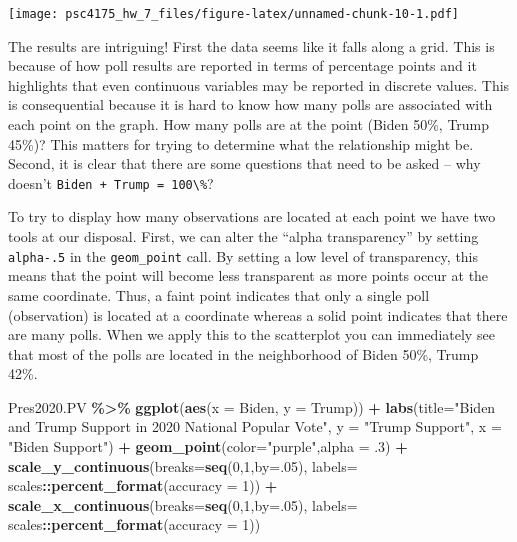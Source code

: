\documentclass[
]{article}
\newenvironment{Shaded}{\begin{snugshade}}{\end{snugshade}}
\newcommand{\AttributeTok}[1]{\textcolor[rgb]{0.13,0.29,0.53}{#1}}
\newcommand{\DecValTok}[1]{\textcolor[rgb]{0.00,0.00,0.81}{#1}}
\newcommand{\FunctionTok}[1]{\textcolor[rgb]{0.13,0.29,0.53}{\textbf{#1}}}
\newcommand{\NormalTok}[1]{#1}
\newcommand{\SpecialCharTok}[1]{\textcolor[rgb]{0.81,0.36,0.00}{\textbf{#1}}}
\newcommand{\StringTok}[1]{\textcolor[rgb]{0.31,0.60,0.02}{#1}}
\begin{document}
\texttt{[image: psc4175\_hw\_7\_files/figure-latex/unnamed-chunk-10-1.pdf]}

The results are intriguing! First the data seems like it falls along a
grid. This is because of how poll results are reported in terms of
percentage points and it highlights that even continuous variables may
be reported in discrete values. This is consequential because it is hard
to know how many polls are associated with each point on the graph. How
many polls are at the point (Biden 50\%, Trump 45\%)? This matters for
trying to determine what the relationship might be. Second, it is clear
that there are some questions that need to be asked -- why doesn't
\texttt{Biden\ +\ Trump\ =\ 100\textbackslash{}\%}?

To try to display how many observations are located at each point we
have two tools at our disposal. First, we can alter the ``alpha
transparency'' by setting \texttt{alpha-.5} in the \texttt{geom\_point}
call. By setting a low level of transparency, this means that the point
will become less transparent as more points occur at the same
coordinate. Thus, a faint point indicates that only a single poll
(observation) is located at a coordinate whereas a solid point indicates
that there are many polls. When we apply this to the scatterplot you can
immediately see that most of the polls are located in the neighborhood
of Biden 50\%, Trump 42\%.

\begin{Shaded}
\begin{Highlighting}[]
\NormalTok{Pres2020.PV }\SpecialCharTok{\%\textgreater{}\%}
  \FunctionTok{ggplot}\NormalTok{(}\FunctionTok{aes}\NormalTok{(}\AttributeTok{x =}\NormalTok{ Biden, }\AttributeTok{y =}\NormalTok{ Trump)) }\SpecialCharTok{+} 
  \FunctionTok{labs}\NormalTok{(}\AttributeTok{title=}\StringTok{"Biden and Trump Support in 2020 National Popular Vote"}\NormalTok{,}
       \AttributeTok{y =} \StringTok{"Trump Support"}\NormalTok{,}
       \AttributeTok{x =} \StringTok{"Biden Support"}\NormalTok{) }\SpecialCharTok{+} 
  \FunctionTok{geom\_point}\NormalTok{(}\AttributeTok{color=}\StringTok{"purple"}\NormalTok{,}\AttributeTok{alpha =}\NormalTok{ .}\DecValTok{3}\NormalTok{) }\SpecialCharTok{+} 
    \FunctionTok{scale\_y\_continuous}\NormalTok{(}\AttributeTok{breaks=}\FunctionTok{seq}\NormalTok{(}\DecValTok{0}\NormalTok{,}\DecValTok{1}\NormalTok{,}\AttributeTok{by=}\NormalTok{.}\DecValTok{05}\NormalTok{),}
                     \AttributeTok{labels=}\NormalTok{ scales}\SpecialCharTok{::}\FunctionTok{percent\_format}\NormalTok{(}\AttributeTok{accuracy =} \DecValTok{1}\NormalTok{)) }\SpecialCharTok{+}
  \FunctionTok{scale\_x\_continuous}\NormalTok{(}\AttributeTok{breaks=}\FunctionTok{seq}\NormalTok{(}\DecValTok{0}\NormalTok{,}\DecValTok{1}\NormalTok{,}\AttributeTok{by=}\NormalTok{.}\DecValTok{05}\NormalTok{),}
                     \AttributeTok{labels=}\NormalTok{ scales}\SpecialCharTok{::}\FunctionTok{percent\_format}\NormalTok{(}\AttributeTok{accuracy =} \DecValTok{1}\NormalTok{))}
\end{Highlighting}
\end{Shaded}
\end{document}
